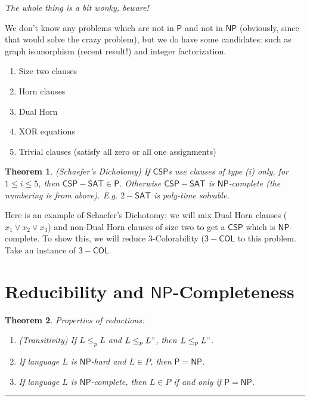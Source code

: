\documentclass[twoside]{article}
\newcounter{lecnum}
\newtheorem{theorem}{Theorem}[lecnum]
\newenvironment{proof}{{\bf Proof:}}{\hfill\rule{2mm}{2mm}}
\begin{document}
\emph{The whole thing is a bit wonky, beware!}

We don't know any problems which are not in $\mathsf{P}$ and not in $\mathsf{NP}$ (obviously, since that would solve the crazy problem), but we do have some candidates: such as graph isomorphism (recent result!) and integer factorization. 

\begin{enumerate}
\item Size two clauses
\item Horn clauses
\item Dual Horn
\item XOR equations
\item Trivial clauses (satisfy all zero or all one assignments)
\end{enumerate}

\begin{theorem}
(Schaefer's Dichotomy) If $\mathsf{CSP}$s use clauses of type (i) only, for $1 \leq i \leq 5$, then $\mathsf{CSP-SAT} \in \mathsf{P}$. Otherwise $\mathsf{CSP-SAT}$ is $\mathsf{NP}$-complete (the numbering is from above). E.g. $2-\mathsf{SAT}$ is poly-time solvable.  
\end{theorem}

Here is an example of Schaefer's Dichotomy: we will mix Dual Horn clauses ($x_1 \lor x_2 \lor x_3$) and non-Dual Horn clauses of size two to get a $\mathsf{CSP}$ which is $\mathsf{NP}$-complete. To show this, we will reduce 3-Colorability ($\mathsf{3-COL}$ to this problem. Take an instance of $\mathsf{3-COL}$. 

\section{Reducibility and $\mathsf{NP}$-Completeness}

\begin{theorem}
Properties of reductions:
\begin{enumerate}
\item (Transitivity) If $L \leq_p L$ and $L\leq_p L"$, then $L \leq_p L"$.
\item If language $L$ is $\mathsf{NP}$-hard and $L \in P$, then $\mathsf{P} = \mathsf{NP}$.
\item If language $L$ is $\mathsf{NP}$-complete, then $L \in P$ if and only if $\mathsf{P}= \mathsf{NP}$.
\end{enumerate}
\end{theorem}
\begin{proof}

\end{proof}
\end{document}
